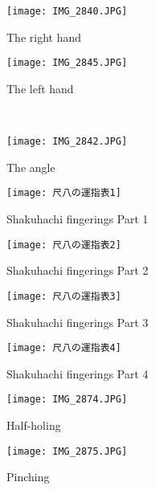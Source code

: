 
\begin{figure}[H]
	\centering
	\begin{minipage}{0.4\textwidth}
	\centering
	\texttt{[image: IMG\_2840.JPG]}
	\caption{The right hand}
	\label{fig:right_hand_position}
	\end{minipage}
	\hfill
	\begin{minipage}{0.4\textwidth}
	\centering
	\vspace{1cm}
	\texttt{[image: IMG\_2845.JPG]}
	\caption{The left hand}
	\label{fig:left_hand_position}
	\end{minipage}
	\\
	\centering
	\begin{minipage}{0.4\textwidth}
	\centering
	\texttt{[image: IMG\_2842.JPG]}
	\caption{The angle}
	\label{fig:angle}
	\end{minipage}
	\hfill*

\end{figure}

\begin{figure}[H]
	\centering
	\texttt{[image: 尺八の運指表1]}
	\caption{Shakuhachi fingerings Part 1}
	\label{fig:shakuhachi_fingerings_1}
\end{figure}

\begin{figure}[H]
	\centering
	\texttt{[image: 尺八の運指表2]}
	\caption{Shakuhachi fingerings Part 2}
	\label{fig:shakuhachi_fingerings_2}
\end{figure}

\begin{figure}[H]
	\centering
	\texttt{[image: 尺八の運指表3]}
	\caption{Shakuhachi fingerings Part 3}
	\label{fig:shakuhachi_fingerings_3}
\end{figure}

\begin{figure}[H]
	\centering
	\texttt{[image: 尺八の運指表4]}
	\caption{Shakuhachi fingerings Part 4}
	\label{fig:shakuhachi_fingerings_4}
\end{figure}

\vfill

\begin{figure}
	\centering
	\begin{minipage}{0.4\textwidth}
	\centering
	\texttt{[image: IMG\_2874.JPG]}
	\caption{Half-holing} \label{fig:half-holing}
	\end{minipage}
	\hfill
	\begin{minipage}{0.4\textwidth}
	\texttt{[image: IMG\_2875.JPG]}
	\caption{Pinching} \label{fig:pinching}
	\end{minipage}
\end{figure}
